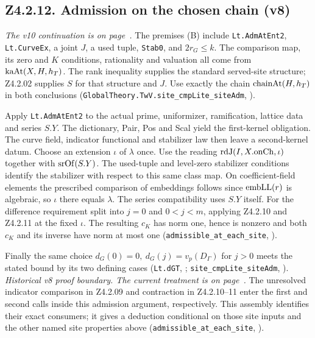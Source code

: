 \subsection{Z4.2.12. Admission on the chosen chain (v8)}\label{r6:Z4.2.12}
\emph{The v10 continuation is on page~\pageref{r8:Z4.2.12}.}
The premises (B) include \nolinkurl{Lt.AdmAtEnt2}, \nolinkurl{Lt.CurveEx}, a joint \(J\), a used tuple, \nolinkurl{Stab0}, and \(2r_G\le k\). The comparison map, its zero and \(K\) conditions, rationality and valuation all come from \({\rm kaAt}(X,H,h_T)\). The rank inequality supplies the standard served-site structure; Z4.2.02 supplies \(S\) for that structure and \(J\). Use exactly the chain \({\rm chainAt}(H,h_T)\) in both conclusions (\nolinkurl{GlobalTheory.TwV.site_cmpLite_siteAdm}, ).

Apply \nolinkurl{Lt.AdmAtEnt2} to the actual prime, uniformizer, ramification, lattice data and series \(S.Y\). The dictionary, Pair, Pos and Scal yield the first-kernel obligation. The curve field, indicator functional and stabilizer law then leave a second-kernel datum. Choose an extension \(\iota\) of \(\lambda\) once. Use the reading \({\rm rdJ}(I,X.{\rm onCh},\iota)\) together with \({\rm srOf}(S.Y)\). The used-tuple and level-zero stabilizer conditions identify the stabilizer with respect to this same class map. On coefficient-field elements the prescribed comparison of embeddings follows since \({\rm embLL}(r)\) is algebraic, so \(\iota\) there equals \(\lambda\). The series compatibility uses \(S.Y\) itself. For the difference requirement split into \(j=0\) and \(0<j<m\), applying Z4.2.10 and Z4.2.11 at the fixed \(\iota\). The resulting \(c_K\) has norm one, hence is nonzero and both \(c_K\) and its inverse have norm at most one (\nolinkurl{admissible_at_each_site}, ).

Finally the same choice \(d_G(0)=0,\ d_G(j)=v_p(D_\Gamma)\) for \(j>0\) meets the stated bound by its two defining cases (\nolinkurl{Lt.dGT}, ; \nolinkurl{site_cmpLite_siteAdm}, ).
\emph{Historical v8 proof boundary. The current treatment is on page~\pageref{r8:Z4.2.12}.} The unresolved indicator comparison in Z4.2.09 and contraction in Z4.2.10--11 enter the first and second calls inside this admission argument, respectively. This assembly identifies their exact consumers; it gives a deduction conditional on those site inputs and the other named site properties above (\nolinkurl{admissible_at_each_site}, ).


